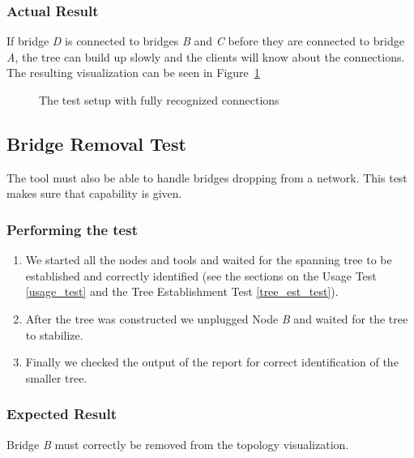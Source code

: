 \subsubsection*{Actual Result}
If bridge \textit{D} is connected to bridges \textit{B} and \textit{C} before they are connected to bridge \textit{A}, the tree can build up slowly and the clients will know about the connections.
The resulting visualization can be seen in Figure~\ref{fig:est}
\begin{figure}[h]
    \centering
    \caption{The test setup with fully recognized connections}
    \label{fig:est}
\end{figure}

\subsection*{Bridge Removal Test}
\label{removal_test}
The tool must also be able to handle bridges dropping from a network.
This test makes sure that capability is given.

\subsubsection*{Performing the test}
\begin{enumerate}
    \item We started all the nodes and tools and waited for the spanning tree to be established and correctly identified (see the sections on the Usage Test \ref{usage_test} and the Tree Establishment Test \ref{tree_est_test}).
    \item After the tree was constructed we unplugged Node \textit{B} and waited for the tree to stabilize.
    \item Finally we checked the output of the report for correct identification of the smaller tree.
\end{enumerate}

\subsubsection*{Expected Result}
Bridge \textit{B} must correctly be removed from the topology visualization.

